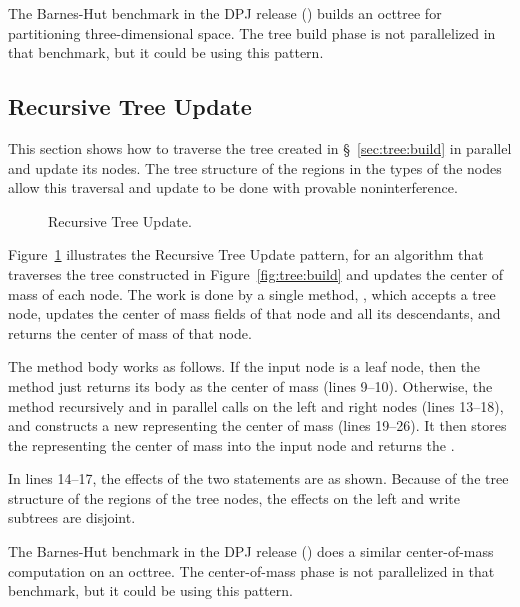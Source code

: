 The Barnes-Hut benchmark in the DPJ release
() builds an octtree for
partitioning three-dimensional space.  The tree build phase is not
parallelized in that benchmark, but it could be using this pattern.

\subsection{Recursive Tree Update%
\label{sec:tree:update}}

This section shows how to traverse the tree created in
\S~\ref{sec:tree:build} in parallel and update its nodes.  The tree
structure of the regions in the types of the nodes allow this
traversal and update to be done with provable noninterference.

\begin{figure}

\caption{Recursive Tree Update.}
\label{fig:tree:update}
\end{figure}

 Figure~\ref{fig:tree:update}
illustrates the Recursive Tree Update pattern, for an algorithm that
traverses the tree constructed in Figure~\ref{fig:tree:build} and
updates the center of mass of each node.  The work is done by a single
method, , which accepts a tree node, updates
the center of mass fields of that node and all its descendants, and
returns the center of mass of that node.

The method body works as follows.  If the input node is a leaf node,
then the method just returns its body as the center of mass (lines
9--10).  Otherwise, the method recursively and in parallel calls
 on the left and right nodes (lines 13--18),
and constructs a new  representing the center of mass (lines
19--26).  It then stores the  representing the center of
mass into the input node and returns the .

In lines 14--17, the effects of the two  statements are
as shown.  Because of the tree structure of the regions of the tree
nodes, the effects on the left and write subtrees are disjoint.


 The Barnes-Hut benchmark in the DPJ release
() does a similar
center-of-mass computation on an octtree.  The center-of-mass phase is
not parallelized in that benchmark, but it could be using this
pattern.


